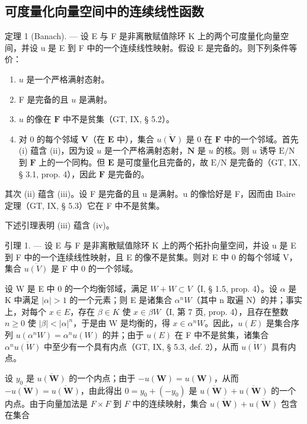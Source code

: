 \subsection{可度量化向量空间中的连续线性函数}

定理 1 (Banach). --- 设 E 与 F 是非离散赋值除环 K 上的两个可度量化向量空间，并设 u 是 E 到 F 中的一个连续线性映射。假设 E 是完备的。则下列条件等价：

\begin{enumerate}
\def\labelenumi{(\roman{enumi})}
\item
  \(u\) 是一个严格满射态射。
\item
  F 是完备的且 \(u\) 是满射。
\item
  \(u\) 的像在 \(\mathbf{F}\) 中不是贫集（GT, IX, § 5.2）。
\item
  对 0 的每个邻域 \(\mathbf{V}\)（在 \(\mathbf{E}\) 中），集合 \(\overline{u(\mathbf{V})}\) 是 0 在 \(\mathbf{F}\) 中的一个邻域。首先 (i) 蕴含 (ii)，因为设 \(u\) 是一个严格满射态射，\(\mathbf{N}\) 是 \(u\) 的核。则 \(u\) 诱导 \(\mathrm{E/N}\) 到 \(\mathbf{F}\) 上的一个同构。但 \(\mathbf{E}\) 是可度量化且完备的，故 \(\mathrm{E/N}\) 是完备的（GT, IX, § 3.1, prop. 4），因此 \(\mathbf{F}\) 是完备的。
\end{enumerate}

其次 (ii) 蕴含 (iii)。设 F 是完备的且 u 是满射。u 的像恰好是 F，因而由 Baire 定理（GT, IX, § 5.3）它在 F 中不是贫集。

下述引理表明 (iii) 蕴含 (iv)。

引理 1. --- 设 E 与 F 是非离散赋值除环 K 上的两个拓扑向量空间，并设 u 是 E 到 F 中的一个连续线性映射，且 E 的像不是贫集。则对 E 中 0 的每个邻域 V，集合 \(\overline{u(V)}\) 是 F 中 0 的一个邻域。

设 W 是 E 中 0 的一个均衡邻域，满足 \(W + W \subset V\)（I, § 1.5, prop. 4）。设 \(\alpha\) 是 K 中满足 \(|\alpha| > 1\) 的一个元素；则 E 是诸集合 \(\alpha^{n}W\)（其中 n 取遍 N）的并；事实上，对每个 \(x \in E\)，存在 \(\beta \in K\) 使 \(x \in \beta W\)（I, 第 7 页, prop. 4），且存在整数 \(n \geqslant 0\) 使 \(|\beta| < |\alpha|^{n}\)，于是由 W 是均衡的，得 \(x \in \alpha^{n}W\)。因此，\(u(E)\) 是集合序列 \(u(\alpha^{n}W) = \alpha^{n}u(W)\) 的并；由于 \(u(E)\) 在 F 中不是贫集，诸集合 \(\alpha^{n}\overline{u(W)}\) 中至少有一个具有内点（GT, IX, § 5.3, def. 2），从而 \(\overline{u(W)}\) 具有内点。

设 \(y_0\) 是 \(\overline{u(\mathbf{W})}\) 的一个内点；由于 \(-u(\mathbf{W}) = u(\mathbf{W})\)，从而 \(-\overline{u(\mathbf{W})} = \overline{u(\mathbf{W})}\)，由此得出 \(0 = y_0 + (-y_0)\) 是 \(\overline{u(\mathbf{W})} + \overline{u(\mathbf{W})}\) 的一个内点。由于向量加法是 \(F \times F\) 到 \(F\) 中的连续映射，集合 \(\overline{u(\mathbf{W})} + \overline{u(\mathbf{W})}\) 包含在集合

